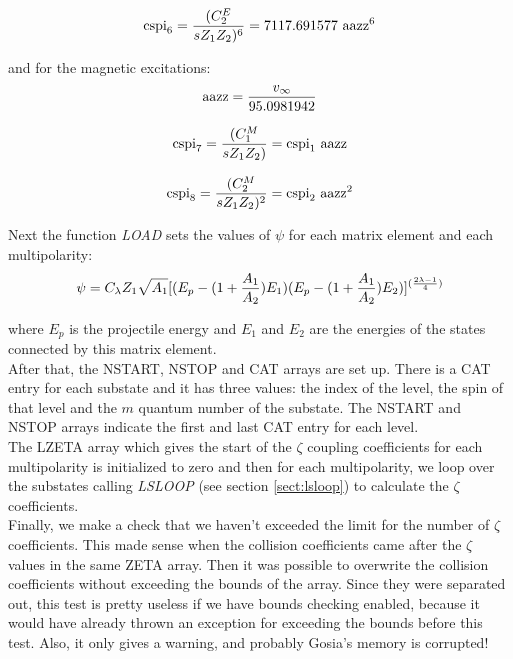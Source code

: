 \begin{equation}
\mathrm{cspi}_6 = {(C_2^E \over s Z_1 Z_2)^6} = 7117.691577 ~\mathrm{aazz}^6
\end{equation}

\noindent and for the magnetic excitations:\\

\begin{equation}
\mathrm{aazz} = {v_\infty \over 95.0981942}
\end{equation}

\begin{equation}
\mathrm{cspi}_7 = {(C_1^M \over s Z_1 Z_2)} = \mathrm{cspi}_1 ~\mathrm{aazz}
\end{equation}

\begin{equation}
\mathrm{cspi}_8 = {(C_2^M \over s Z_1 Z_2)^2} = \mathrm{cspi}_2 ~\mathrm{aazz}^2
\end{equation}

\noindent Next the function {\em LOAD} sets the values of $\psi$ for each
matrix element and each multipolarity:\\

\begin{equation}
\psi = C_\lambda Z_1 \sqrt{A_1} \large[(E_p - (1 + {A_1 \over A_2}) E_1)
(E_p - (1 + {A_1 \over A_2}) E_2)\large]^{({2 \lambda - 1 \over 4})}
\end{equation}

\noindent where $E_p$ is the projectile energy and $E_1$ and $E_2$ are the
energies of the states connected by this matrix element.\\

\noindent After that, the NSTART, NSTOP and CAT arrays are set up. There is
a CAT entry for each substate and it has three values: the index of the
level, the spin of that level and the $m$ quantum number of the substate.
The NSTART and NSTOP arrays indicate the first and last CAT entry for each
level.\\

\noindent The LZETA array which gives the start of the $\zeta$ coupling
coefficients for each multipolarity is initialized to zero and then for each
multipolarity, we loop over the substates calling {\em LSLOOP} (see section
\ref{sect:lsloop}) to calculate the $\zeta$ coefficients.\\

\noindent Finally, we make a check that we haven't exceeded the limit for
the number of $\zeta$ coefficients. This made sense when the collision
coefficients came after the $\zeta$ values in the same ZETA array. Then it
was possible to overwrite the collision coefficients without exceeding the
bounds of the array. Since they were separated out, this test is pretty
useless if we have bounds checking enabled, because it would have already
thrown an exception for exceeding the bounds before this test. Also, it only
gives a warning, and probably Gosia's memory is corrupted!\\

